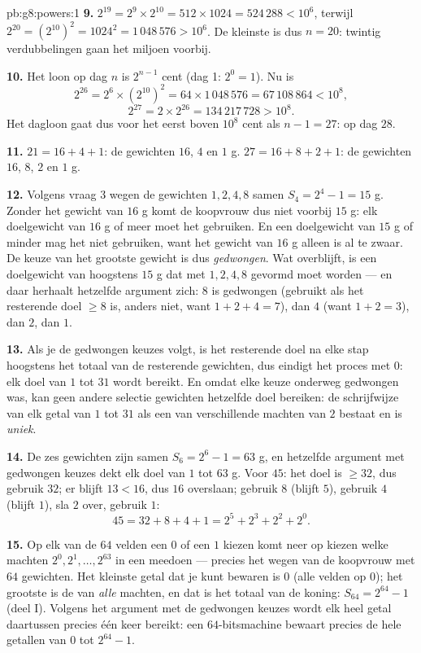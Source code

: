 \begin{solution}{pb:g8:powers:1}
\textbf{9.} $2^{19} = 2^9 \times 2^{10} = 512 \times 1024 = 524\,288 < 10^6$, terwijl
$2^{20} = \left(2^{10}\right)^2 = 1024^2 = 1\,048\,576 > 10^6$. De kleinste  is
dus $n = 20$: twintig verdubbelingen gaan het miljoen voorbij.

\textbf{10.} Het loon op dag $n$ is $2^{n-1}$ cent (dag 1: $2^0 = 1$). Nu is
\[
2^{26} = 2^6 \times \left(2^{10}\right)^2
= 64 \times 1\,048\,576 = 67\,108\,864 < 10^8,
\]
\[
2^{27} = 2 \times 2^{26} = 134\,217\,728 > 10^8 .
\]
Het dagloon gaat dus voor het eerst boven $10^8$ cent als $n - 1 = 27$: op dag $28$.

\textbf{11.} $21 = 16 + 4 + 1$: de gewichten $16$, $4$ en $1$ g.
$27 = 16 + 8 + 2 + 1$: de gewichten $16$, $8$, $2$ en $1$ g.

\textbf{12.} Volgens vraag 3 wegen de gewichten $1, 2, 4, 8$ samen
$S_4 = 2^4 - 1 = 15$ g. Zonder het gewicht van $16$ g komt de koopvrouw dus niet
voorbij $15$ g: elk doelgewicht van $16$ g of meer moet het gebruiken. En een
doelgewicht van $15$ g of minder mag het niet gebruiken, want het gewicht van $16$ g
alleen is al te zwaar. De keuze van het grootste gewicht is dus \emph{gedwongen}. Wat
overblijft, is een doelgewicht van hoogstens $15$ g dat met $1, 2, 4, 8$ gevormd moet
worden --- en daar herhaalt hetzelfde argument zich: $8$ is gedwongen (gebruikt als het
resterende doel $\geq 8$ is, anders niet, want $1 + 2 + 4 = 7$), dan $4$ (want
$1 + 2 = 3$), dan $2$, dan $1$.

\textbf{13.} Als je de gedwongen keuzes volgt, is het resterende doel na elke stap
hoogstens het totaal van de resterende gewichten, dus eindigt het proces met  $0$:
elk doel van $1$ tot $31$ wordt bereikt. En omdat elke keuze onderweg gedwongen was, kan
geen andere selectie gewichten hetzelfde doel bereiken: de schrijfwijze van elk getal van
$1$ tot $31$ als een  van verschillende machten van $2$ bestaat en is \emph{uniek}.

\textbf{14.} De zes gewichten zijn samen $S_6 = 2^6 - 1 = 63$ g, en hetzelfde argument
met gedwongen keuzes dekt elk doel van $1$ tot $63$ g. Voor $45$: het doel is
$\geq 32$, dus gebruik $32$; er blijft $13 < 16$, dus $16$ overslaan; gebruik $8$ (blijft
$5$), gebruik $4$ (blijft $1$), sla $2$ over, gebruik $1$:
\[
45 = 32 + 8 + 4 + 1 = 2^5 + 2^3 + 2^2 + 2^0 .
\]

\textbf{15.} Op elk van de $64$ velden een $0$ of een $1$ kiezen komt neer op kiezen
welke machten $2^0, 2^1, \dots, 2^{63}$ in een  meedoen --- precies het wegen van de
koopvrouw met $64$ gewichten. Het kleinste getal dat je kunt bewaren is $0$ (alle velden
op $0$); het grootste is de  van \emph{alle} machten, en dat is het totaal van de
koning: $S_{64} = 2^{64} - 1$ (deel I). Volgens het argument met de gedwongen keuzes
wordt elk heel getal daartussen precies één keer bereikt: een $64$-bitsmachine bewaart
precies de hele getallen van $0$ tot $2^{64} - 1$.
\end{solution}
